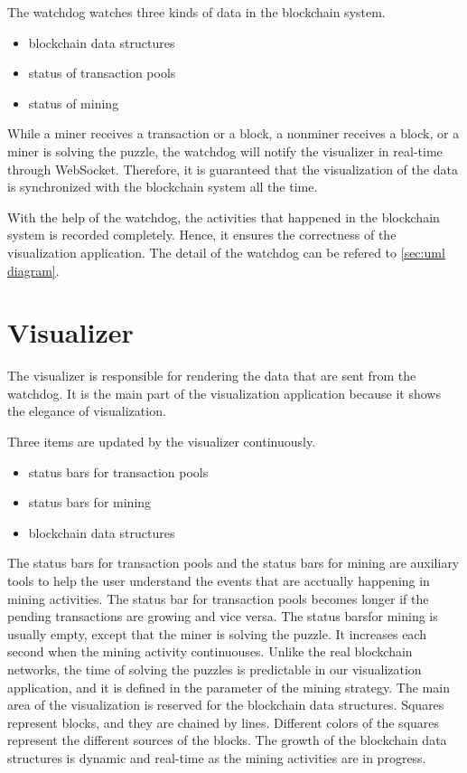 The watchdog watches three kinds of data in the blockchain system.

\begin{itemize}
    \item blockchain data structures
    \item status of transaction pools
    \item status of mining
\end{itemize}

While a miner receives a transaction or a block, a nonminer receives a block, or a miner is solving the puzzle, the watchdog will notify the visualizer in real-time through WebSocket. Therefore, it is guaranteed that the visualization of the data is synchronized with the blockchain system all the time.

With the help of the watchdog, the activities that happened in the blockchain system is recorded completely. Hence, it ensures the correctness of the visualization application. The detail of the watchdog can be refered to \ref{sec:uml diagram}.

\section{Visualizer}

The visualizer is responsible for rendering the data that are sent from the watchdog. It is the main part of the visualization application because it shows the elegance of visualization. 

Three items are updated by the visualizer continuously.

\begin{itemize}
    \item status bars for transaction pools
    \item status bars for mining
    \item blockchain data structures
\end{itemize}

The status bars for transaction pools and the status bars for mining are auxiliary tools to help the user understand the events that are acctually happening in mining activities. The status bar for transaction pools becomes longer if the pending transactions are growing and vice versa. The status barsfor mining is usually empty, except that the miner is solving the puzzle. It increases each second when the mining activity continuouses. Unlike the real blockchain networks, the time of solving the puzzles is predictable in our visualization application, and it is defined in the parameter of the mining strategy. The main area of the visualization is reserved for the blockchain data structures. Squares represent blocks, and they are chained by lines. Different colors of the squares represent the different sources of the blocks. The growth of the blockchain data structures is dynamic and real-time as the mining activities are in progress.


